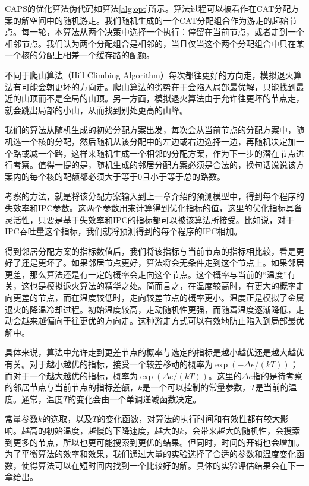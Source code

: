 CAPS的优化算法伪代码如算法\ref{alg:opt}所示。算法过程可以被看作在CAT分配方案的解空间中的随机游走。我们随机生成的一个CAT分配组合作为游走的起始节点。每一轮，本算法从两个决策中选择一个执行：停留在当前节点，或者走到一个相邻节点。我们认为两个分配组合是相邻的，当且仅当这个两个分配组合中只在某一个核的分配上相差一个缓存路的配额。

不同于爬山算法（Hill Climbing Algorithm）每次都往更好的方向走，模拟退火算法有可能会朝更坏的方向走。爬山算法的劣势在于会陷入局部最优解，只能找到最近的山顶而不是全局的山顶。另一方面，模拟退火算法由于允许往更坏的节点走，就会跳出局部的小山，从而找到别处更高的山峰。

我们的算法从随机生成的初始分配方案出发，每次会从当前节点的分配方案中，随机选一个核的分配，然后随机从该分配中的左边或右边选择一边，再随机决定加一个路或减一个路，这样来随机生成一个相邻的分配方案，作为下一步的潜在节点进行考察。值得一提的是，随机生成的邻居分配方案必须是合法的，换句话说说该方案内的每个核的配额都必须大于等于0且小于等于总的路数。

考察的方法，就是将该分配方案输入到上一章介绍的预测模型中，得到每个程序的失效率和IPC参数。这两个参数用来计算得到优化指标的值，这里的优化指标具备灵活性，只要是基于失效率和IPC的指标都可以被该算法所接受。比如说，对于IPC吞吐量这个指标，我们就将预测得到的每个程序的IPC相加。

得到邻居分配方案的指标数值后，我们将该指标与当前节点的指标相比较，看是更好了还是更坏了。如果邻居节点更好，算法将会无条件走到这个节点上。如果邻居更差，那么算法还是有一定的概率会走向这个节点。这个概率与当前的“温度”有关，这也是模拟退火算法的精华之处。简而言之，在温度较高时，有更大的概率走向更差的节点，而在温度较低时，走向较差节点的概率更小。温度正是模拟了金属退火的降温冷却过程。初始温度较高，走动随机性更强，而随着温度逐渐降低，走动会越来越偏向于往更优的方向走。这种游走方式可以有效地防止陷入到局部最优解中。

具体来说，算法中允许走到更差节点的概率与选定的指标是越小越优还是越大越优有关。对于越小越优的指标，接受一个较差移动的概率为$\exp(-\Delta e / (kT))$；而对于一个越大越优的指标，概率为$\exp(\Delta e / (kT))$。这里的$\Delta e$指的是待考察的邻居节点与当前节点的指标差额，$k$是一个可以控制的常量参数，$T$是当前的温度。通常，温度$T$的变化会由一个单调递减函数决定。

常量参数$k$的选取，以及$T$的变化函数，对算法的执行时间和有效性都有较大影响。越高的初始温度，越慢的下降速度，越大的$k$，会带来越大的随机性，会搜索到更多的节点，所以也更可能搜索到更优的结果。但同时，时间的开销也会增加。为了平衡算法的效率和效果，我们通过大量的实验选择了合适的参数和温度变化函数，使得算法可以在短时间内找到一个比较好的解。具体的实验评估结果会在下一章给出。
